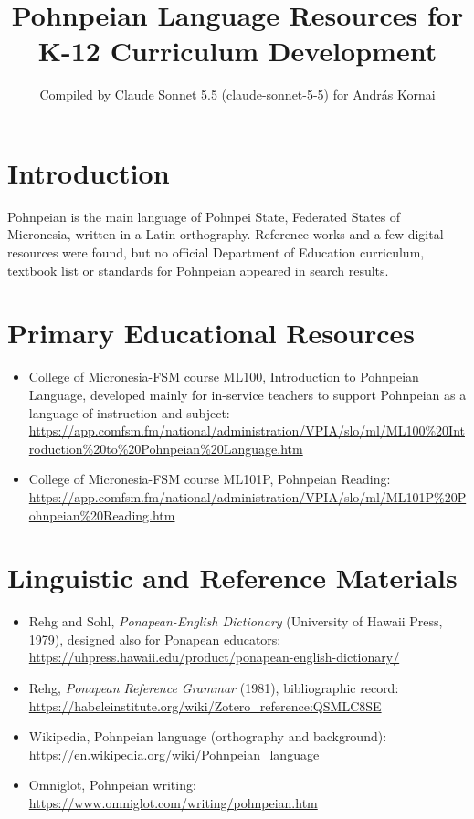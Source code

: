 \documentclass[12pt]{article}
\title{Pohnpeian Language Resources for K-12 Curriculum Development}
\author{Compiled by Claude Sonnet 5.5 (claude-sonnet-5-5) for Andr\'as Kornai}
\date{}
\begin{document}
\maketitle

\section{Introduction}
Pohnpeian is the main language of Pohnpei State, Federated States of Micronesia, written in a Latin orthography. Reference works and a few digital resources were found, but no official Department of Education curriculum, textbook list or standards for Pohnpeian appeared in search results.

\section{Primary Educational Resources}
\begin{itemize}
\item College of Micronesia-FSM course ML100, Introduction to Pohnpeian Language, developed mainly for in-service teachers to support Pohnpeian as a language of instruction and subject: \url{https://app.comfsm.fm/national/administration/VPIA/slo/ml/ML100\%20Introduction\%20to\%20Pohnpeian\%20Language.htm}
\item College of Micronesia-FSM course ML101P, Pohnpeian Reading: \url{https://app.comfsm.fm/national/administration/VPIA/slo/ml/ML101P\%20Pohnpeian\%20Reading.htm}
\end{itemize}

\section{Linguistic and Reference Materials}
\begin{itemize}
\item Rehg and Sohl, \emph{Ponapean-English Dictionary} (University of Hawaii Press, 1979), designed also for Ponapean educators: \url{https://uhpress.hawaii.edu/product/ponapean-english-dictionary/}
\item Rehg, \emph{Ponapean Reference Grammar} (1981), bibliographic record: \url{https://habeleinstitute.org/wiki/Zotero_reference:QSMLC8SE}
\item Wikipedia, Pohnpeian language (orthography and background): \url{https://en.wikipedia.org/wiki/Pohnpeian_language}
\item Omniglot, Pohnpeian writing: \url{https://www.omniglot.com/writing/pohnpeian.htm}
\end{itemize}
\end{document}
